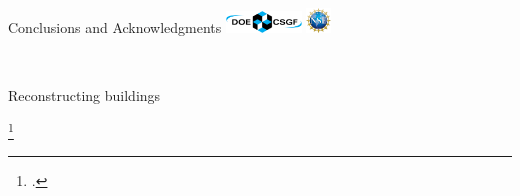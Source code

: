 \documentclass[10pt]{beamer}
\begin{document}
\begin{frame}{Conclusions and Acknowledgments \hspace{0.5in} \includegraphics[width=0.15\textwidth]{CSGF_horiz_1200x360.png}
\hspace{0.1in} \includegraphics[width=0.05\textwidth]{nsf1.jpg}}
\begin{minipage}{0.2\textwidth}
	\\ {\footnotesize Reconstructing buildings \footnotemark \par}
	\end{minipage}
	\footcitetext{golparvar2011monitoring}
		
%	        
%
%	    
    
\end{frame}
\end{document}
